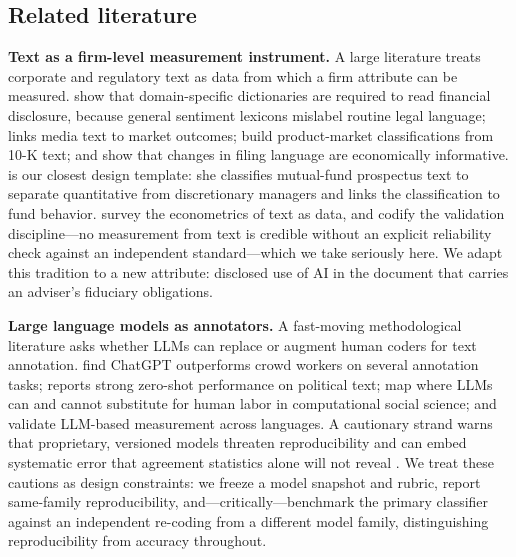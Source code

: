 \documentclass[utf8]{FrontiersinHarvard}
\begin{document}
\subsection{Related literature}
\textbf{Text as a firm-level measurement instrument.} A large literature treats corporate and regulatory text as data from which a firm attribute can be measured. \citet{loughran2011,loughran2016} show that domain-specific dictionaries are required to read financial disclosure, because general sentiment lexicons mislabel routine legal language; \citet{tetlock2007} links media text to market outcomes; \citet{hoberg2016} build product-market classifications from 10-K text; and \citet{cohenLazy2020} show that changes in filing language are economically informative. \citet{abis2022} is our closest design template: she classifies mutual-fund prospectus text to separate quantitative from discretionary managers and links the classification to fund behavior. \citet{gentzkow2019} survey the econometrics of text as data, and \citet{grimmer2013} codify the validation discipline---no measurement from text is credible without an explicit reliability check against an independent standard---which we take seriously here. We adapt this tradition to a new attribute: disclosed use of AI in the document that carries an adviser's fiduciary obligations.

\textbf{Large language models as annotators.} A fast-moving methodological literature asks whether LLMs can replace or augment human coders for text annotation. \citet{gilardi2023} find ChatGPT outperforms crowd workers on several annotation tasks; \citet{tornberg2023} reports strong zero-shot performance on political text; \citet{ziems2024} map where LLMs can and cannot substitute for human labor in computational social science; and \citet{rathje2024} validate LLM-based measurement across languages. A cautionary strand warns that proprietary, versioned models threaten reproducibility and can embed systematic error that agreement statistics alone will not reveal \citep{ollion2024,bommasani2021}. We treat these cautions as design constraints: we freeze a model snapshot and rubric, report same-family reproducibility, and---critically---benchmark the primary classifier against an independent re-coding from a different model family, distinguishing reproducibility from accuracy throughout.
\end{document}
